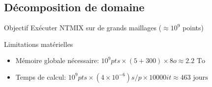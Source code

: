 \documentclass{beamer}
\begin{document}
\subsection{Décomposition de domaine}
\begin{frame}
  \begin{block}{Objectif}
    Exécuter NTMIX sur de grands maillages ($\approx 10^9$ points)
  \end{block}
  \pause
  \begin{alertblock}{Limitations matérielles}
    \begin{itemize}
    \item     Mémoire globale nécessaire: 
      $10^9pts \times (5+300) \times 8o \approx 2.2 \text{ To}$
    \item     Temps de calcul: $10^9 pts\times(4\times10^{-6})s/p\times10000it\approx463 \text{ jours}$
    \end{itemize}
  \end{alertblock}
  
\end{frame}
\end{document}
